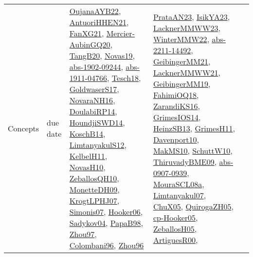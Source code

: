 {\begin{longtable}{lp{3cm}>{\raggedright}p{6cm}>{\raggedright}p{6cm}p{8cm}}
Concepts & due date & \href{papers/OujanaAYB22.pdf}{OujanaAYB22}\cite{OujanaAYB22}, \href{papers/AntuoriHHEN21.pdf}{AntuoriHHEN21}\cite{AntuoriHHEN21}, \href{articles/FanXG21.pdf}{FanXG21}\cite{FanXG21}, \href{papers/Mercier-AubinGQ20.pdf}{Mercier-AubinGQ20}\cite{Mercier-AubinGQ20}, \href{papers/TangB20.pdf}{TangB20}\cite{TangB20}, \href{articles/Novas19.pdf}{Novas19}\cite{Novas19}, \href{articles/abs-1902-09244.pdf}{abs-1902-09244}\cite{abs-1902-09244}, \href{articles/abs-1911-04766.pdf}{abs-1911-04766}\cite{abs-1911-04766}, \href{papers/Tesch18.pdf}{Tesch18}\cite{Tesch18}, \href{papers/GoldwaserS17.pdf}{GoldwaserS17}\cite{GoldwaserS17}, \href{articles/NovaraNH16.pdf}{NovaraNH16}\cite{NovaraNH16}, \href{papers/DoulabiRP14.pdf}{DoulabiRP14}\cite{DoulabiRP14}, \href{papers/HoundjiSWD14.pdf}{HoundjiSWD14}\cite{HoundjiSWD14}, \href{papers/KoschB14.pdf}{KoschB14}\cite{KoschB14}, \href{articles/LimtanyakulS12.pdf}{LimtanyakulS12}\cite{LimtanyakulS12}, \href{articles/KelbelH11.pdf}{KelbelH11}\cite{KelbelH11}, \href{articles/NovasH10.pdf}{NovasH10}\cite{NovasH10}, \href{articles/ZeballosQH10.pdf}{ZeballosQH10}\cite{ZeballosQH10}, \href{papers/MonetteDH09.pdf}{MonetteDH09}\cite{MonetteDH09}, \href{papers/KrogtLPHJ07.pdf}{KrogtLPHJ07}\cite{KrogtLPHJ07}, \href{articles/Simonis07.pdf}{Simonis07}\cite{Simonis07}, \href{articles/Hooker06.pdf}{Hooker06}\cite{Hooker06}, \href{papers/Sadykov04.pdf}{Sadykov04}\cite{Sadykov04}, \href{articles/PapaB98.pdf}{PapaB98}\cite{PapaB98}, \href{articles/Zhou97.pdf}{Zhou97}\cite{Zhou97}, \href{papers/Colombani96.pdf}{Colombani96}\cite{Colombani96}, \href{papers/Zhou96.pdf}{Zhou96}\cite{Zhou96} & \href{articles/PrataAN23.pdf}{PrataAN23}\cite{PrataAN23}, \href{articles/IsikYA23.pdf}{IsikYA23}\cite{IsikYA23}, \href{articles/LacknerMMWW23.pdf}{LacknerMMWW23}\cite{LacknerMMWW23}, \href{papers/WinterMMW22.pdf}{WinterMMW22}\cite{WinterMMW22}, \href{articles/abs-2211-14492.pdf}{abs-2211-14492}\cite{abs-2211-14492}, \href{papers/GeibingerMM21.pdf}{GeibingerMM21}\cite{GeibingerMM21}, \href{papers/LacknerMMWW21.pdf}{LacknerMMWW21}\cite{LacknerMMWW21}, \href{papers/GeibingerMM19.pdf}{GeibingerMM19}\cite{GeibingerMM19}, \href{articles/FahimiOQ18.pdf}{FahimiOQ18}\cite{FahimiOQ18}, \href{articles/ZarandiKS16.pdf}{ZarandiKS16}\cite{ZarandiKS16}, \href{articles/GrimesIOS14.pdf}{GrimesIOS14}\cite{GrimesIOS14}, \href{articles/HeinzSB13.pdf}{HeinzSB13}\cite{HeinzSB13}, \href{papers/GrimesH11.pdf}{GrimesH11}\cite{GrimesH11}, \href{papers/Davenport10.pdf}{Davenport10}\cite{Davenport10}, \href{papers/MakMS10.pdf}{MakMS10}\cite{MakMS10}, \href{papers/SchuttW10.pdf}{SchuttW10}\cite{SchuttW10}, \href{papers/ThiruvadyBME09.pdf}{ThiruvadyBME09}\cite{ThiruvadyBME09}, \href{articles/abs-0907-0939.pdf}{abs-0907-0939}\cite{abs-0907-0939}, \href{papers/MouraSCL08a.pdf}{MouraSCL08a}\cite{MouraSCL08a}, \href{papers/Limtanyakul07.pdf}{Limtanyakul07}\cite{Limtanyakul07}, \href{papers/ChuX05.pdf}{ChuX05}\cite{ChuX05}, \href{papers/QuirogaZH05.pdf}{QuirogaZH05}\cite{QuirogaZH05}, \href{papers/cp-Hooker05.pdf}{cp-Hooker05}\cite{cp-Hooker05}, \href{articles/ZeballosH05.pdf}{ZeballosH05}\cite{ZeballosH05}, \href{articles/ArtiguesR00.pdf}{ArtiguesR00}\cite{ArtiguesR00}, 
\end{longtable}}
